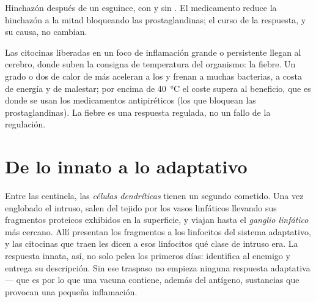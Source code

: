\begin{omfigure}

{\small Hinchazón después de un esguince, con y sin .
El medicamento reduce la hinchazón a la mitad bloqueando las
prostaglandinas; el curso de la respuesta, y su causa, no cambian.}
\end{omfigure}

\begin{example}[La fiebre]\label{ex:g12:innate-immunity:fever}
Las citocinas liberadas en un foco de inflamación grande o persistente
llegan al cerebro, donde suben la consigna de temperatura del
organismo: la fiebre. Un grado o dos de calor de más aceleran a los
 y frenan a muchas bacterias, a costa de energía y de
malestar; por encima de \qty{40}{\celsius} el coste supera al
beneficio, que es donde se usan los medicamentos antipiréticos (los que
bloquean las prostaglandinas). La fiebre es una respuesta regulada, no
un fallo de la regulación.
\end{example}

\section{De lo innato a lo adaptativo}

\begin{proposition}[El traspaso]\label{prop:g12:innate-immunity:handover}
Entre las  centinela, las \emph{células
dendríticas} tienen un segundo cometido. Una
vez englobado el intruso, salen del tejido por los vasos linfáticos
llevando sus fragmentos proteicos exhibidos en la superficie, y viajan
hasta el \emph{ganglio linfático} más cercano. Allí presentan los
fragmentos a los linfocitos del sistema adaptativo, y las citocinas que
traen les dicen a esos linfocitos qué clase de intruso era. La
respuesta innata, así, no solo pelea los primeros días: identifica al
enemigo y entrega su descripción. Sin ese traspaso no empieza ninguna
respuesta adaptativa --- que es por lo que una vacuna contiene, además
del antígeno, sustancias que provocan una pequeña inflamación.
\end{proposition}
\admitted

